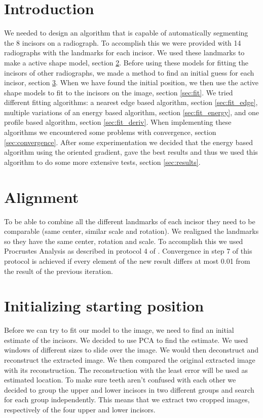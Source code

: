 \documentclass[a4paper,10pt]{article}
\begin{document}


\tableofcontents
\newpage

\section{Introduction}\label{sec:introduction}
We needed to design an algorithm that is capable of automatically segmenting the 8 incisors on a radiograph.
To accomplish this we were provided with 14 radiographs with the landmarks for each incisor. We used these landmarks to make a active shape model, section \ref{sec:alignment}. Before using these models for fitting the incisors of other radiographs, we made a method to find an initial guess for each incisor, section \ref{sec:initial}. When we have found the initial position, we then use the active shape models to fit to the incisors on the image, section \ref{sec:fit}. We tried different fitting algorithms: a nearest edge based algorithm, section \ref{sec:fit_edge}, multiple variations of an energy based algorithm, section \ref{sec:fit_energy}, and one profile based algorithm, section \ref{sec:fit_deriv}. When implementing these algorithms we encountered some problems with convergence, section \ref{sec:convergence}. After some experimentation we decided that the energy based algorithm using the oriented gradient, gave the best results and thus we used this algorithm to do some more extensive tests, section \ref{sec:results}.


\section{Alignment} \label{sec:alignment}
To be able to combine all the different landmarks of each incisor they need to be comparable (same center, similar scale and rotation). We realigned the landmarks so they have the same center, rotation and scale. To accomplish this we used Procrustes Analysis as described in protocol 4 of \cite{TemplateAlgorithm}. Convergence in step 7 of this protocol is achieved if every element of the new result differs at most 0.01 from the result of the previous iteration.


\section{Initializing starting position}\label{sec:initial}
Before we can try to fit our model to the image, we need to find an initial estimate of the incisors. We decided to use PCA to find the estimate. We used windows of different sizes to slide over the image. We would then deconstruct and reconstruct the extracted image. We then compared the original extracted image with its reconstruction. The reconstruction with the least error will be used as estimated location.
To make sure teeth aren't confused with each other we decided to group the upper and lower incisors in two different groups and search for each group independently. This means that we extract two cropped images, respectively of the four upper and lower incisors.
\end{document}
